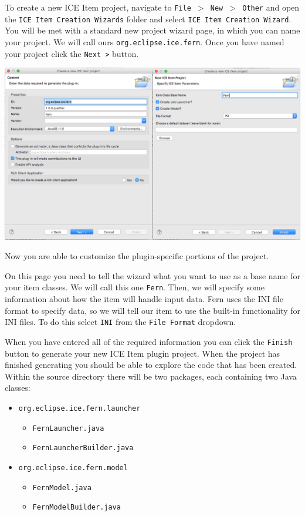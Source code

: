 To create a new ICE Item project, navigate to \texttt{File $>$ New $>$ Other}
and open the \texttt{ICE Item Creation Wizards} folder and 
select \texttt{ICE Item Creation Wizard}. You will be met with a standard new
project wizard page, in which you can name your project.  We will call ours
\texttt{org.eclipse.ice.fern}. Once you have named your project click the \texttt{Next >} button.
\begin{center} \includegraphics[width=\textwidth]{figures/comb23} \end{center}
Now you are able to customize the plugin-specific portions of the project. 

On this page you need to tell the wizard what you want to use as a base
name for your item classes. We will call this one \texttt{Fern}. Then, we will
specify some information about how the item will handle input data.  Fern uses
the INI file format to specify data, so we will tell our item to use the built-in
functionality for INI files.  To do this select \texttt{INI} from the \texttt{File Format} dropdown.  

When you have entered all of the required information you can
click the \texttt{Finish} button to generate your new ICE Item plugin project.
When the project has finished generating you should be able to explore the code
that has been created.  Within the source directory there will be two packages,
each containing two Java classes:

\begin{itemize} 
    \item \texttt{org.eclipse.ice.fern.launcher} 
    \begin{itemize}
        \item \texttt{FernLauncher.java} 
        \item \texttt{FernLauncherBuilder.java}
    \end{itemize} 
    \item \texttt{org.eclipse.ice.fern.model} 
    \begin{itemize} 
        \item \texttt{FernModel.java} 
        \item \texttt{FernModelBuilder.java}
    \end{itemize} 
\end{itemize}

